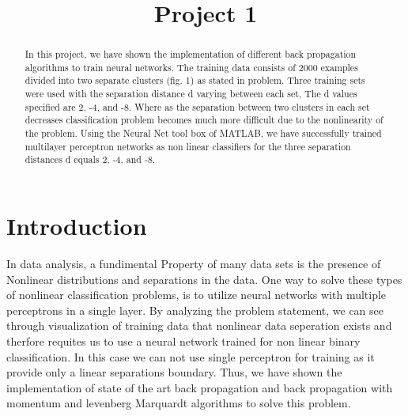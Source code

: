 \documentclass[conference]{IEEEtran}
\begin{document}
\title{Project 1}

\author{
	\and
{}
\and	
{}
	
	
}


\maketitle


\begin{abstract}
 In this project, we have shown the implementation of  different back propagation algorithms to train neural networks. The training data consists of 2000 examples divided into two separate clusters (fig. 1) as stated in problem. Three training sets were used with the separation distance d varying between each set, The d values specified are 2, -4, and -8. Where as the separation between two clusters in each set decreases classification problem becomes much more difficult due to the nonlinearity of the problem. Using the Neural Net tool box of MATLAB, we have successfully trained multilayer perceptron networks as non linear classifiers for the three separation distances d equals 2, -4, and -8.
\end{abstract}


\section{Introduction}

In data analysis, a fundimental Property of many data sets is the presence of Nonlinear distributions and separations in the data. One way to solve these types of nonlinear classification problems\cite{ol}, is to utilize neural networks with multiple perceptrons in a single layer. By analyzing the problem statement, we can see through visualization of training data that nonlinear data seperation exists and therfore requites us to use a neural network trained for non linear binary classification. In this case we can not use single perceptron for training as it provide only a linear separations boundary. Thus, we have shown the implementation of state of the art back propagation and back propagation with momentum and levenberg Marquardt algorithms to solve this problem.
\end{document}
